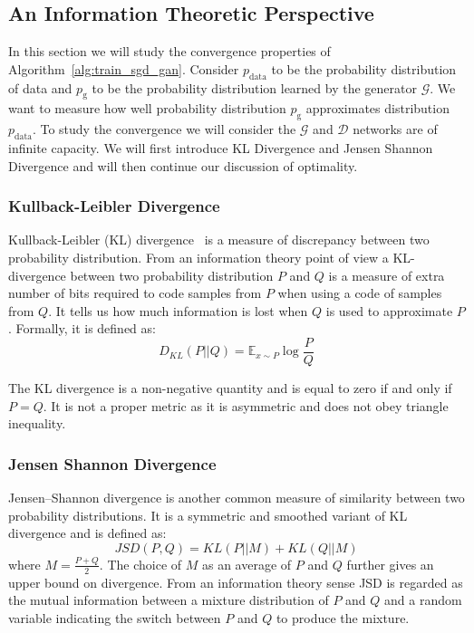 \subsection{An Information Theoretic Perspective}
In this section we will study the convergence properties of Algorithm~\ref{alg:train_sgd_gan}. Consider $p_\text{data}$ to be the probability distribution of data and $p_\text{g}$ to be the probability distribution learned by the generator $\mathcal{G}$. We want to measure how well probability distribution $p_\text{g}$ approximates distribution $p_\text{data}$. To study the convergence we will consider the $\mathcal{G}$ and $\mathcal{D}$ networks are of infinite capacity. We will first introduce KL Divergence and Jensen Shannon Divergence and will then continue our discussion of optimality.

\subsubsection{Kullback-Leibler Divergence}
\label{subsec:kld}
Kullback-Leibler (KL)
divergence~\cite{kullback1951information} is a measure of discrepancy between two probability distribution. From an information theory point of view a KL-divergence between two probability distribution $P$ and $Q$ is a measure of extra number of bits required to code samples from $P$ when using a code of samples from $Q$. It tells us how much information is lost when $Q$ is used to approximate $P$. Formally, it is defined as:
\begin{equation}
    \label{eq:kld}
    D_{KL} (P || Q) = \mathbb{E}_{x\sim P} \log \frac{P}{Q}
\end{equation}

The KL divergence is a non-negative quantity and is equal to zero if and only if $P=Q$. It is not a proper metric as it is asymmetric and does not obey triangle inequality.


\subsubsection{Jensen Shannon Divergence}
\label{subsec:jsd}
Jensen–Shannon divergence is another common measure of similarity between two probability distributions. It is a symmetric and smoothed variant of KL divergence and is defined as:
\begin{equation}
    \label{eq:jen_shan}
    JSD(P,Q) = KL(P||M) + KL(Q||M)
\end{equation}
where $M = \frac{P+Q}{2}$. The choice of $M$ as an average of $P$ and $Q$ further gives an upper bound on divergence. From an information theory sense JSD is regarded as the mutual information between a mixture distribution of $P$ and $Q$ and a random variable indicating the switch between $P$ and $Q$ to produce the mixture.

